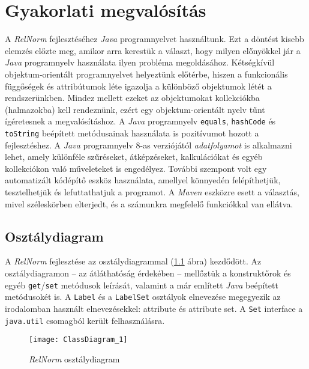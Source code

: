 \chapter{Gyakorlati megvalósítás}
\label{ch:gyakorlat}

A \textit{RelNorm} fejlesztéséhez \textit{Java} programnyelvet használtunk. Ezt a döntést kisebb elemzés előzte meg, amikor arra kerestük a választ, hogy milyen előnyökkel jár a \textit{Java} programnyelv használata ilyen probléma megoldásához. Kétségkívül objektum-orientált programnyelvet helyeztünk előtérbe, hiszen a funkcionális függőségek és attribútumok léte igazolja a különböző objektumok létét a rendszerünkben. Mindez mellett ezeket az objektumokat kollekciókba (halmazokba) kell rendeznünk, ezért egy objektum-orientált nyelv tűnt ígéretesnek a megvalósításhoz. A \textit{Java} programnyelv \lstinline{equals}, \lstinline{hashCode} és \lstinline{toString} beépített metódusainak használata is pozitívumot hozott a fejlesztéshez. A \textit{Java} programnyelv 8-as verziójától \textit{adatfolyamot}  is alkalmazni lehet, amely különféle szűréseket, átképzéseket, kalkulációkat és egyéb kollekciókon való műveleteket is engedélyez.
További szempont volt egy automatizált kódépítő eszköz használata, amellyel könnyedén felépíthetjük, tesztelhetjük és lefuttathatjuk a programot. A \textit{Maven} eszközre esett a választás, mivel széleskörben elterjedt, és a számunkra megfelelő funkciókkal van ellátva.

\section{Osztálydiagram}

A \textit{RelNorm} fejlesztése az osztálydiagrammal (\ref{fig:class} ábra) kezdődött. Az osztálydiagramon -- az átláthatóság érdekében -- mellőztük a konstruktőrok és egyéb \lstinline{get}/\lstinline{set} metódusok leírását, valamint a már említett \textit{Java} beépített metódusokét is. A \lstinline{Label} és a \lstinline{LabelSet} osztályok elnevezése megegyezik az irodalomban használt elnevezésekkel: attribute és attribute set. A \lstinline{Set} interface a \lstinline{java.util} csomagból került felhasználásra.

\begin{figure}
    \centering
    \texttt{[image: ClassDiagram\_1]}
    \caption{\textit{RelNorm} osztálydiagram}
    \label{fig:class}
\end{figure}
 
